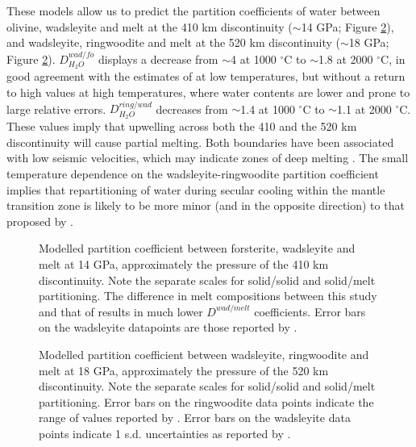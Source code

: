 \documentclass[review]{elsarticle}
\begin{document}
These models allow us to predict the partition coefficients of water between olivine, wadsleyite and melt at the 410 km discontinuity ($\sim$14 GPa; Figure \ref{fig:partitioning_rw_wad}), and wadsleyite, ringwoodite and melt at the 520 km discontinuity ($\sim$18 GPa; Figure \ref{fig:partitioning_rw_wad}). $D^{wad/fo}_{H_2O}$ displays a decrease from $\sim$4 at 1000 $^{\circ}$C to $\sim$1.8 at 2000 $^{\circ}$C, in good agreement with the estimates of \cite{LSOK2011} at low temperatures, but without a return to high values at high temperatures, where water contents are lower and prone to large relative errors. $D^{ring/wad}_{H_2O}$ decreases from $\sim$1.4 at 1000 $^{\circ}$C to $\sim$1.1 at 2000 $^{\circ}$C. These values imply that upwelling across both the 410 and the 520 km discontinuity will cause partial melting. Both boundaries have been associated with low seismic velocities, which may indicate zones of deep melting \citep[e.g.][]{JDH2010}. The small temperature dependence on the wadsleyite-ringwoodite partition coefficient implies that repartitioning of water during secular cooling within the mantle transition zone is likely to be more minor (and in the opposite direction) to that proposed by \cite{DDFK2005}. 

\begin{figure}[ht!]
  \centering
  \caption{Modelled partition coefficient between forsterite, wadsleyite and melt at 14 GPa, approximately the pressure of the 410 km discontinuity. Note the separate scales for solid/solid and solid/melt partitioning. The difference in melt compositions between this study and that of \cite{DDFK2005} results in much lower $D^{wad/melt}$ coefficients. Error bars on the wadsleyite datapoints are those reported by \cite{DDFK2005}.}
  \label{fig:partitioning_wad_fo}
\end{figure}

\begin{figure}[ht!]
  \centering
  \caption{Modelled partition coefficient between wadsleyite, ringwoodite and melt at 18 GPa, approximately the pressure of the 520 km discontinuity. Note the separate scales for solid/solid and solid/melt partitioning. Error bars on the ringwoodite data points indicate the range of values reported by \cite{OMY2000}. Error bars on the wadsleyite data points indicate 1 s.d. uncertainties as reported by \cite{LSOK2011}.}
  \label{fig:partitioning_rw_wad}
\end{figure}
\end{document}
